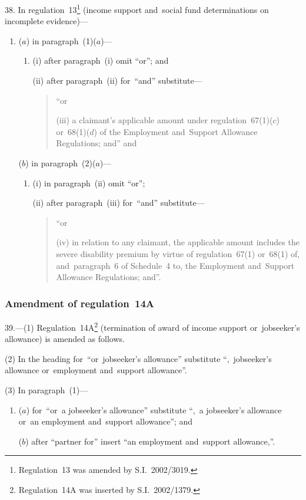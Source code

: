 \documentclass[12pt,a4paper]{article}
\begin{document}
38.  In regulation~13\footnote{Regulation~13 was amended by S.I.~2002/3019.} (income support and~social fund determinations on incomplete evidence)—
\begin{enumerate}\item[]
($a$) in paragraph~(1)($a$)—
\begin{enumerate}\item[]
(i) after paragraph~(i)  omit “or”; and

(ii) after paragraph~(ii)  for~“and” substitute—
\begin{quotation}\sloppy
“or

(iii) a claimant’s applicable amount under regulation~67(1)($c$)  or~68(1)($d$)  of the Employment and~Support Allowance Regulations; and” and
\end{quotation}
\end{enumerate}

($b$) in paragraph~(2)($a$)—
\begin{enumerate}\item[]
(i) in paragraph~(ii)  omit “or”;

(ii) after paragraph~(iii)  for~“and” substitute—
\begin{quotation}
“or

(iv) in relation to any claimant, the applicable amount includes the severe disability premium by virtue of regulation~67(1) or~68(1) of, and~paragraph~6 of Schedule~4 to, the Employment and~Support Allowance Regulations; and”.
\end{quotation}
\end{enumerate}
\end{enumerate}

\subsubsection[39. Amendment of regulation~14A]{Amendment of regulation~14A}

39.---(1)  Regulation~14A\footnote{Regulation~14A was inserted by S.I.~2002/1379.} (termination of award of income support or~jobseeker’s allowance) is amended as follows.

(2) In the heading for~“or~jobseeker’s allowance” substitute “,~jobseeker’s allowance or~employment and~support allowance”.

(3) In paragraph~(1)—
\begin{enumerate}\item[]
($a$) for~“or~a jobseeker’s allowance” substitute “,~a jobseeker’s allowance or~an employment and~support allowance”; and

($b$) after “partner for” insert “an employment and~support allowance,”.
\end{enumerate}
\end{document}
